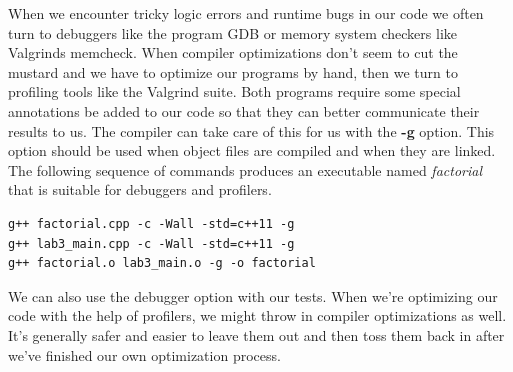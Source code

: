 \documentclass[]{tufte-handout}
\begin{document}
When we encounter tricky logic errors and runtime bugs in our code we often turn to debuggers like the program GDB or memory system checkers like Valgrinds memcheck.  When compiler optimizations don't seem to cut the mustard and we have to optimize our programs by hand, then we turn to profiling tools like the Valgrind suite.  Both programs require some special annotations be added to our code so that they can better communicate their results to us. The compiler can take care of this for us with the \textbf{-g} option. This option should be used when object files are compiled and when they are linked. The following sequence of commands produces an executable named \textit{factorial} that is suitable for debuggers and profilers.   
\begin{verbatim}
g++ factorial.cpp -c -Wall -std=c++11 -g 
g++ lab3_main.cpp -c -Wall -std=c++11 -g
g++ factorial.o lab3_main.o -g -o factorial
\end{verbatim}
We can also use the debugger option with our tests. When we're optimizing our code with the help of profilers, we might throw in compiler optimizations as well. It's generally safer and easier to leave them out and then toss them back in after we've finished our own optimization process.
\end{document}
